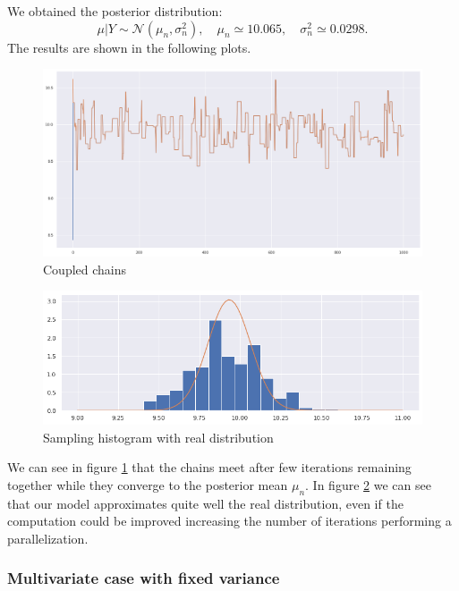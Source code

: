\documentclass {article}
\begin{document}
We obtained the posterior distribution:
$$  
\mu | Y \sim \mathcal{N}(\mu_n, \sigma^2_n), 
\quad \mu_n  \simeq 10.065,
\quad \sigma^2_n \simeq 0.0298.
$$
The results are shown in the following plots.
\begin{figure}[h!]
	\centering
	\includegraphics[width=\textwidth]{abc_coupling/2catabccoupling}	
	\caption{Coupled chains}
	\label{complete1}
	
\end{figure}

\begin{figure}[h!]
	\centering
	\includegraphics[width=\textwidth]{abc_coupling/histabccoupling}
	\caption{Sampling histogram with real distribution}   %
	\label{complete2}
\end{figure}

We can see in figure \ref{complete1} that the chains meet after few iterations remaining together while they converge to the posterior mean $\mu_{n}$. In figure \ref{complete2} we can see that our model approximates quite well the real distribution, even if the computation could be improved increasing the number of iterations performing a parallelization. %



\subsubsection{Multivariate case with fixed variance}
\end{document}
